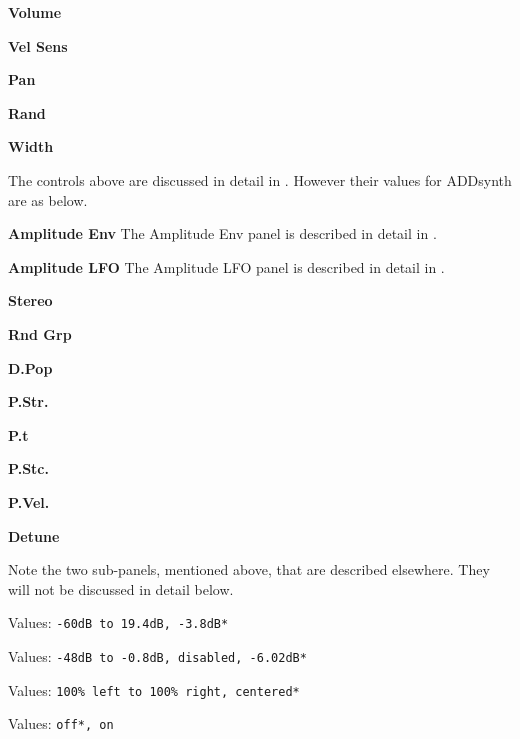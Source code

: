    \begin{enumber}
      \item \textbf{Volume}
      \item \textbf{Vel Sens}
      \item \textbf{Pan}
      \item \textbf{Rand}
      \item \textbf{Width}

       The controls above are discussed in detail in
       . However their values for ADDsynth
       are as below.

      \item \textbf{Amplitude Env}
         The Amplitude Env panel is described in detail in
         .
      \item \textbf{Amplitude LFO}
         The Amplitude LFO panel is described in detail in
         .

      \item \textbf{Stereo}
      \item \textbf{Rnd Grp}
      \item \textbf{D.Pop}
      \item \textbf{P.Str.}
      \item \textbf{P.t}
      \item \textbf{P.Stc.}
      \item \textbf{P.Vel.}
      \item \textbf{Detune}
   \end{enumber}

   Note the two sub-panels, mentioned above, that are described elsewhere.
   They will not be discussed in detail below.

   \setcounter{ItemCounter}{0}      %


   Values: \texttt{-60dB to 19.4dB, -3.8dB*}


   Values: \texttt{-48dB to -0.8dB, disabled, -6.02dB*}


   Values: \texttt{100\% left to 100\% right, centered*}


   Values: \texttt{off*, on}

